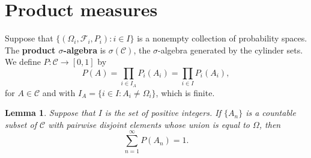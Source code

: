 \documentclass{article}
\newtheorem{lemma}[theorem]{Lemma}
\theoremstyle{definition}
\begin{document}
\section{Product measures}
Suppose that $\{(\Omega_i,\mathscr{F}_i,P_i): i \in I\}$ is a nonempty collection of probability spaces. The \textbf{product $\sigma$-algebra} 
is $\sigma(\mathscr{C})$, the $\sigma$-algebra generated by the cylinder sets. We define $P:\mathscr{C} \to [0,1]$ by
\[
P(A) = \prod_{i \in I_A} P_i(A_i) = \prod_{i \in I} P_i(A_i),
\]
for $A \in \mathscr{C}$ and with $I_A=\{i \in I: A_i \neq \Omega_i\}$, which is finite. 

\begin{lemma}
Suppose that $I$ is the set of positive integers. If $\{A_n\}$ is a countable subset of $\mathscr{C}$ with pairwise disjoint elements whose union is equal to $\Omega$, then
\[
\sum_{n=1}^\infty P(A_n)=1.
\]
\label{countable}
\end{lemma}
\end{document}
